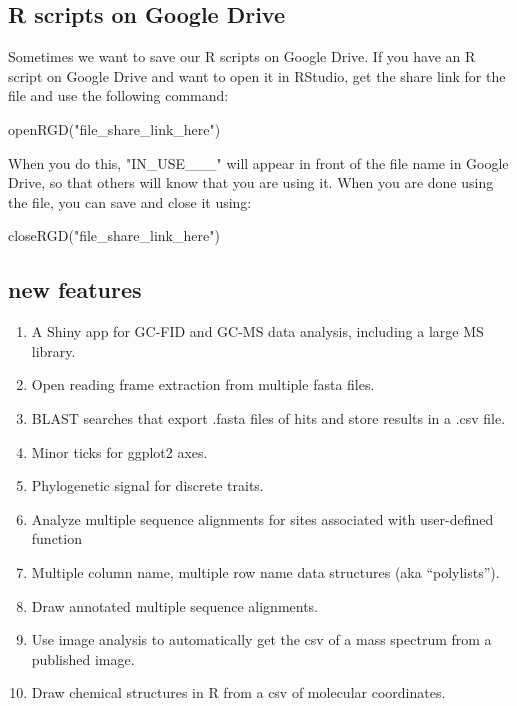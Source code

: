 \documentclass[
]{krantz}
\newenvironment{Shaded}{\begin{snugshade}}{\end{snugshade}}
\newcommand{\FunctionTok}[1]{\textcolor[rgb]{0.00,0.00,0.00}{#1}}
\newcommand{\NormalTok}[1]{#1}
\newcommand{\StringTok}[1]{\textcolor[rgb]{0.31,0.60,0.02}{#1}}
\providecommand{\tightlist}{%
  \setlength{\itemsep}{0pt}\setlength{\parskip}{0pt}}
\begin{document}
\hypertarget{r-scripts-on-google-drive}{%
\subsection{R scripts on Google Drive}\label{r-scripts-on-google-drive}}

Sometimes we want to save our R scripts on Google Drive. If you have an R script on Google Drive and want to open it in RStudio, get the share link for the file and use the following command:

\begin{Shaded}
\begin{Highlighting}[]
\FunctionTok{openRGD}\NormalTok{(}\StringTok{"file\_share\_link\_here"}\NormalTok{)}
\end{Highlighting}
\end{Shaded}

\hfill\break
When you do this, "IN\_USE\_\_\_" will appear in front of the file name in Google Drive, so that others will know that you are using it. When you are done using the file, you can save and close it using:

\begin{Shaded}
\begin{Highlighting}[]
\FunctionTok{closeRGD}\NormalTok{(}\StringTok{"file\_share\_link\_here"}\NormalTok{)}
\end{Highlighting}
\end{Shaded}

\hypertarget{new-features}{%
\subsection{new features}\label{new-features}}

\begin{enumerate}
\def\labelenumi{\arabic{enumi}.}
\tightlist
\item
  A Shiny app for GC-FID and GC-MS data analysis, including a large MS library.
\item
  Open reading frame extraction from multiple fasta files.
\item
  BLAST searches that export .fasta files of hits and store results in a .csv file.
\item
  Minor ticks for ggplot2 axes.
\item
  Phylogenetic signal for discrete traits.
\item
  Analyze multiple sequence alignments for sites associated with user-defined function
\item
  Multiple column name, multiple row name data structures (aka ``polylists'').
\item
  Draw annotated multiple sequence alignments.
\item
  Use image analysis to automatically get the csv of a mass spectrum from a published image.
\item
  Draw chemical structures in R from a csv of molecular coordinates.
\end{enumerate}
\end{document}
